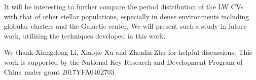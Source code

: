 \documentclass[fleqn,usenatbib]{mnras}
\begin{document}
It will be interesting to further compare the period distribution of the LW CVs with that of other stellar populations, especially in dense environments including globular clusters and the Galactic center. We will present such a study in future work, utilizing the techniques developed in this work.

\vskip0.5cm
We thank Xiangdong Li, Xiaojie Xu and Zhenlin Zhu for helpful discussions. This work is supported by the National Key Research and Development Program of China under grant 2017YFA0402703.


{}

\appendix
\end{document}
